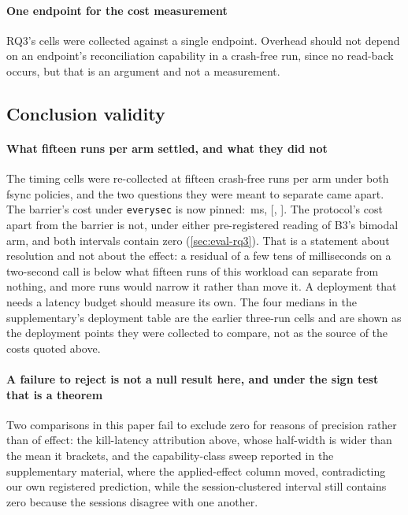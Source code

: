 \paragraph{One endpoint for the cost measurement} RQ3's cells were collected
against a single endpoint. Overhead should not depend on an endpoint's
reconciliation capability in a crash-free run, since no read-back occurs, but
that is an argument and not a measurement.

\subsection{Conclusion validity}

\paragraph{What fifteen runs per arm settled, and what they did not} The
timing cells were re-collected at fifteen crash-free runs per arm under both
fsync policies, and the two questions they were meant to separate came apart.
The barrier's cost under \texttt{everysec} is now pinned:
\BarrierCostFifteen{}\,ms,
[\BarrierCostFifteenLow{}, \BarrierCostFifteenHigh{}]. The protocol's cost
apart from the barrier is not, under either pre-registered reading of B3's
bimodal arm, and both intervals contain zero (\cref{sec:eval-rq3}). That is a
statement about resolution and not about the effect: a residual of a few tens of
milliseconds on a two-second call is below what fifteen runs of this workload
can separate from nothing, and more runs would narrow it rather than move it. A
deployment that needs a latency budget should measure its own. The four medians
in the supplementary's deployment table are the earlier three-run cells and
are shown as the
deployment points they were collected to compare, not as the source of the
costs quoted above.

\paragraph{A failure to reject is not a null result here, and under the sign
test that is a theorem} Two comparisons in this paper fail to exclude zero for
reasons of precision rather than of effect: the kill-latency attribution above,
whose half-width is wider than the mean it brackets, and the capability-class
sweep reported in the supplementary material, where the applied-effect column
moved, contradicting our own registered prediction, while the
session-clustered interval still contains zero because the sessions disagree
with one another.

